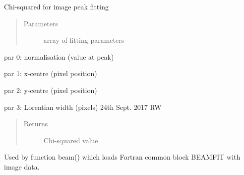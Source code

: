 \documentclass[letterpaper,10pt,english]{sphinxmanual}
\begin{document}
\begin{fulllineitems}
\label{\detokenize{images_functions:images.peakchisq}}
Chi-squared for image peak fitting
\begin{quote}\begin{description}
\item[{Parameters}] \leavevmode
{} \textendash{} array of fitting parameters

\end{description}\end{quote}

\begin{DUlineblock}{0em}
\item[] par 0: normalisation (value at peak)
\item[] par 1: x-centre (pixel position)
\item[] par 2: y-centre (pixel position)
\item[] par 3: Lorentian width (pixels) 24th Sept. 2017 RW
\end{DUlineblock}
\begin{quote}\begin{description}
\item[{Returns}] \leavevmode
Chi-squared value

\end{description}\end{quote}

Used by function beam() which loads Fortran common block BEAMFIT with image data.

\end{fulllineitems}

\end{document}
